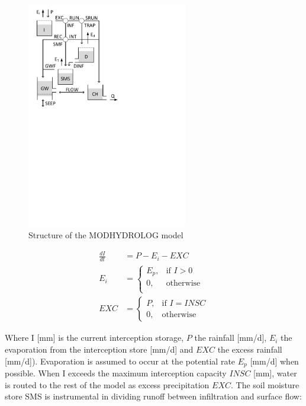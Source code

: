 { 																	%
\begin{figure}
\includegraphics[trim=1cm 16.5cm 9cm 1cm,width=7cm,keepaspectratio]{./files/36_schematic.pdf}
\caption{Structure of the MODHYDROLOG model} \label{fig:36_schematic}
\end{figure}

\begin{align}
	\frac{dI}{dt} &= P-E_i-EXC \\
	E_i &= \begin{cases}
		E_p, &\text{if } I > 0 \\
		0, & \text{otherwise} \\
	\end{cases} \\
	EXC &= 
	\begin{cases}
		P, & \text{if } I = INSC \\
		0, & \text{otherwise}
	\end{cases}
\end{align}

Where I [mm] is the current interception storage, $P$ the rainfall [mm/d], $E_i$ the evaporation from the interception store [mm/d] and $EXC$ the excess rainfall [mm/d]). Evaporation is assumed to occur at the potential rate $E_p$ [mm/d] when possible. When I exceeds the maximum interception capacity $INSC$ [mm], water is routed to the rest of the model as excess precipitation $EXC$. The soil moisture store SMS is instrumental in dividing runoff between infiltration and surface flow:

} %

